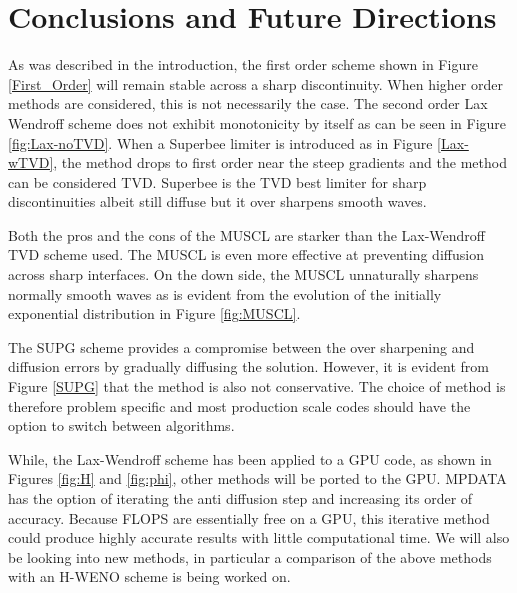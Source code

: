 \section{Conclusions and Future Directions}
\label{conclusions}

As was described in the introduction, the first order scheme shown in Figure \ref{First_Order} will remain stable across a sharp discontinuity. When higher order methods are considered, this is not necessarily the case. The second order Lax Wendroff scheme does not exhibit monotonicity by itself as can be seen in Figure \ref{fig:Lax-noTVD}. When a Superbee limiter is introduced as in Figure \ref{Lax-wTVD}, the method drops to first order near the steep gradients and the method can be considered TVD. Superbee is the TVD best limiter for sharp discontinuities albeit still diffuse but it over sharpens smooth waves.

Both the pros and the cons of the MUSCL are starker than the Lax-Wendroff TVD scheme used. The MUSCL is even more effective at preventing diffusion across sharp interfaces. On the down side, the MUSCL unnaturally sharpens normally smooth waves as is evident from the evolution of the initially exponential distribution in Figure \ref{fig:MUSCL}. 

The SUPG scheme provides a compromise between the over sharpening and diffusion errors by gradually diffusing the solution. However, it is evident from Figure \ref{SUPG} that the method is also not conservative. The choice of method is therefore problem specific and most production scale codes should have the option to switch between algorithms.

While, the Lax-Wendroff scheme has been applied to a GPU code, as shown in Figures \ref{fig:H} and \ref{fig:phi}, other methods will be ported to the GPU. MPDATA has the option of iterating the anti diffusion step and increasing its order of accuracy. Because FLOPS are essentially free on a GPU, this iterative method could produce highly accurate results with little computational time. We will also be looking into new methods, in particular a comparison of the above methods with an H-WENO scheme is being worked on.